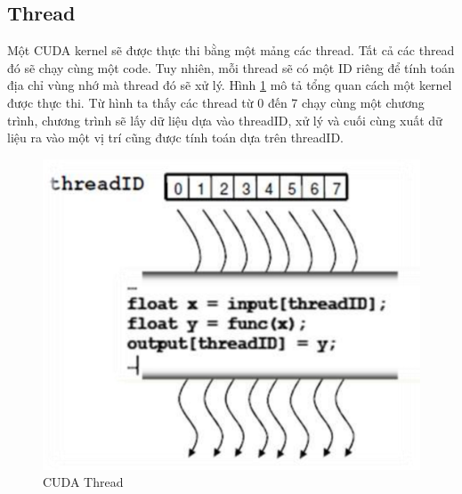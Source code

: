 \documentclass[../../main.tex]{subfiles}
\begin{document}
\subsection*{Thread}
Một CUDA kernel sẽ được thực thi bằng một mảng các thread. Tất cả các thread đó sẽ chạy cùng một code. Tuy nhiên, mỗi thread sẽ có một ID riêng để tính toán địa chỉ vùng nhớ mà thread đó sẽ xử lý. Hình \ref{fig:cuda-thread} mô tả tổng quan cách một kernel được thực thi. Từ hình ta thấy các thread từ 0 đến 7 chạy cùng một chương trình, chương trình sẽ lấy dữ liệu dựa vào threadID, xử  lý và cuối cùng xuất dữ liệu ra vào một vị trí cũng được tính toán dựa trên threadID.

\begin{figure}[H]
    \begin{center}
        \includegraphics[scale=0.2]{cuda-thread.png}
    \end{center}
    \caption{CUDA Thread}
    \label{fig:cuda-thread}
\end{figure}
\end{document}
